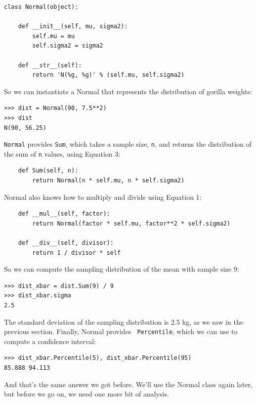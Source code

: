 \documentclass[12pt]{book}
\begin{document}
\begin{verbatim}
class Normal(object):

    def __init__(self, mu, sigma2):
        self.mu = mu
        self.sigma2 = sigma2

    def __str__(self):
        return 'N(%g, %g)' % (self.mu, self.sigma2)
\end{verbatim}

So we can instantiate a Normal that represents the distribution
of gorilla weights:

\begin{verbatim}
>>> dist = Normal(90, 7.5**2)
>>> dist
N(90, 56.25)
\end{verbatim}

{\tt Normal} provides {\tt Sum}, which takes a sample size, {\tt n},
and returns the distribution of the sum of {\tt n} values, using
Equation 3:

\begin{verbatim}
    def Sum(self, n):
        return Normal(n * self.mu, n * self.sigma2)
\end{verbatim}

Normal also knows how to multiply and divide using
Equation 1:

\begin{verbatim}
    def __mul__(self, factor):
        return Normal(factor * self.mu, factor**2 * self.sigma2)

    def __div__(self, divisor):
        return 1 / divisor * self
\end{verbatim}

So we can compute the sampling distribution of the mean with sample
size 9:

\begin{verbatim}
>>> dist_xbar = dist.Sum(9) / 9
>>> dist_xbar.sigma
2.5
\end{verbatim}

The standard deviation of the sampling distribution is 2.5 kg, as we
saw in the previous section.  Finally, Normal provides {\tt
  Percentile}, which we can use to compute a confidence interval:

\begin{verbatim}
>>> dist_xbar.Percentile(5), dist_xbar.Percentile(95)
85.888 94.113
\end{verbatim}

And that's the same answer we got before.  We'll use the Normal
class again later, but before we go on, we need one more bit of
analysis.
\end{document}
